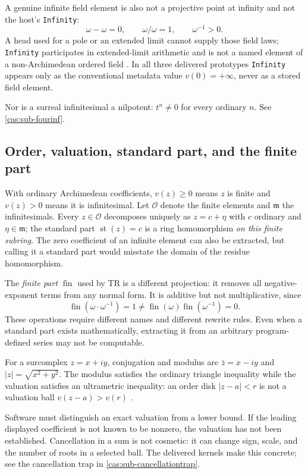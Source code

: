 \documentclass[11pt,letterpaper]{article}
\numberwithin{equation}{section}
\theoremstyle{definition}
\theoremstyle{remark}
\newcommand{\OO}{\mathcal O}
\newcommand{\mm}{\mathfrak m}
\newcommand{\st}{\operatorname{st}}
\newcommand{\fin}{\operatorname{fin}}
\begin{document}
A genuine infinite field element is also not a projective point at infinity and
not the host's \texttt{Infinity}:
\[
 \omega-\omega=0,\qquad \omega/\omega=1,\qquad \omega^{-1}>0.
\]
A head used for a pole or an extended limit cannot supply those field laws;
\texttt{Infinity} participates in extended-limit arithmetic and is not a named
element of a non-Archimedean ordered field \cite{cas:WLInfinity}. In all three
delivered prototypes \texttt{Infinity} appears only as the conventional metadata
value $v(0)=+\infty$, never as a stored field element.

Nor is a surreal infinitesimal a nilpotent: $t^n\ne0$ for every ordinary $n$.
See \cref{cas:sub-fourinf}.

\subsection{Order, valuation, standard part, and the finite part}
\label{cas:sub-st}
With ordinary Archimedean coefficients, $v(z)\ge0$ means $z$ is finite and
$v(z)>0$ means it is infinitesimal. Let $\OO$ denote the finite elements and
$\mm$ the infinitesimals. Every $z\in\OO$ decomposes uniquely as $z=c+\eta$ with
$c$ ordinary and $\eta\in\mm$; the standard part $\st(z)=c$ is a ring
homomorphism \emph{on this finite subring}. The zero coefficient of an infinite
element can also be extracted, but calling it a standard part would misstate the
domain of the residue homomorphism.

The \emph{finite part} $\fin$ used by TR is a different projection: it removes
all negative-exponent terms from any normal form. It is additive but not
multiplicative, since
\[
 \fin(\omega\cdot\omega^{-1})=1\ne\fin(\omega)\fin(\omega^{-1})=0 .
\]
These operations require different names and different rewrite rules. Even when
a standard part exists mathematically, extracting it from an arbitrary
program-defined series may not be computable.

For a surcomplex $z=x+iy$, conjugation and modulus are $\bar z=x-iy$ and
$|z|=\sqrt{x^2+y^2}$. The modulus satisfies the ordinary triangle inequality
while the valuation satisfies an ultrametric inequality: an order disk
$|z-a|<r$ is not a valuation ball $v(z-a)>v(r)$ \cite{cas:SourcePolynomial}.

Software must distinguish an exact valuation from a lower bound. If the leading
displayed coefficient is not known to be nonzero, the valuation has not been
established. Cancellation in a sum is not cosmetic: it can change sign, scale,
and the number of roots in a selected ball. The delivered kernels make this
concrete; see the cancellation trap in \cref{cas:sub-cancellationtrap}.
\end{document}
